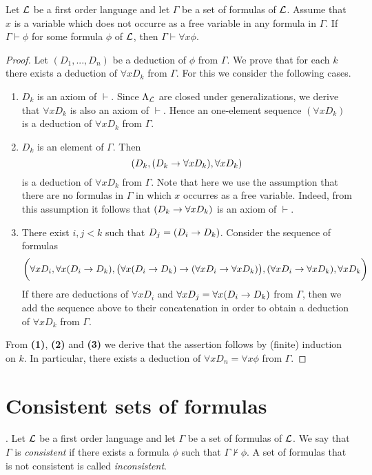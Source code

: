 \begin{theorem}\label{theorem:generalization_rule}
Let ${\mathcal L}$ be a first order language and let $\Gamma$ be a set of formulas of ${\mathcal L}$. Assume that $x$ is a variable which does not occurre as a free variable in any formula in $\Gamma$. If $\Gamma \vdash \phi$ for some formula $\phi$ of ${\mathcal L}$, then $\Gamma \vdash \forall x\phi$.
\end{theorem}
\begin{proof}
Let $(D_1,...,D_n)$ be a deduction of $\phi$ from $\Gamma$. We prove that for each $k$ there exists a deduction of $\forall xD_k$ from $\Gamma$. For this we consider the following cases.
\begin{enumerate}[label=\textbf{(\arabic*)}, leftmargin=3.0em]
\item $D_k$ is an axiom of $\vdash$. Since $\Lambda_{{\mathcal L}}$ are closed under generalizations, we derive that $\forall xD_k$ is also an axiom of $\vdash$. Hence an one-element sequence $(\forall xD_k)$ is a deduction of $\forall x D_k$ from $\Gamma$.
\item $D_k$ is an element of $\Gamma$. Then
$$(D_k,(D_k \rightarrow \forall x D_k),\forall x D_k)$$
is a deduction of $\forall xD_k$ from $\Gamma$. Note that here we use the assumption that there are no formulas in $\Gamma$ in which $x$ occurres as a free variable. Indeed, from this assumption it follows that $(D_k \rightarrow \forall xD_k)$ is an axiom of $\vdash$.
\item There exist $i, j < k$ such that $D_j = (D_i \rightarrow D_k)$. Consider the sequence of formulas
$$\bigg(\forall xD_i , \forall x (D_i \rightarrow D_k ) , \big(\forall x (D_i \rightarrow D_k ) \rightarrow (\forall xD_i \rightarrow \forall xD_k)\big) , (\forall xD_i \rightarrow \forall xD_k) , \forall xD_k\bigg)$$
If there are deductions of $\forall x D_i$ and $\forall xD_j = \forall x (D_i \rightarrow D_k)$ from $\Gamma$, then we add the sequence above to their concatenation in order to obtain a deduction of $\forall x D_k$ from $\Gamma$.
\end{enumerate}
From \textbf{(1)}, \textbf{(2)} and \textbf{(3)} we derive that the assertion follows by (finite) induction on $k$. In particular, there exists a deduction of $\forall x D_n = \forall x \phi$ from $\Gamma$.
\end{proof}

\section{Consistent sets of formulas}

\begin{definition}.
Let ${\mathcal L}$ be a first order language and let $\Gamma$ be a set of formulas of ${\mathcal L}$. We say that $\Gamma$ is \textit{consistent} if there exists a formula $\phi$ such that $\Gamma \nvdash \phi$. A set of formulas that is not consistent is called \textit{inconsistent}.
\end{definition}

